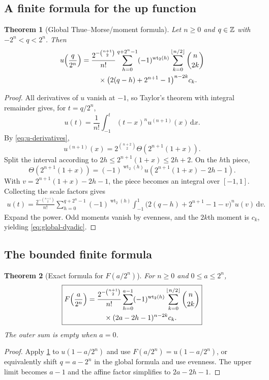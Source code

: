 \documentclass[11pt]{article}
\newtheorem{theorem}{Theorem}[section]
\theoremstyle{definition}
\theoremstyle{remark}
\newcommand{\wt}{\operatorname{wt}_2}\newcommand{\upfun}{\operatorname{up}}
\newcommand{\dd}{\,\mathrm d}\newcommand{\e}{\mathrm e}\newcommand{\ii}{\mathrm i}
\begin{document}
\subsection{A finite formula for the up function}
\begin{theorem}[Global Thue--Morse/moment formula]\label{thm:global-dyadic}
Let $n\ge0$ and $q\in\mathbb Z$ with $-2^n<q<2^n$.  Then
\begin{equation}\label{eq:global-dyadic}
\begin{aligned}
 u\!\left(\frac q{2^n}\right)
 ={}&\frac{2^{-\binom{n+1}{2}}}{n!}
 \sum_{h=0}^{q+2^n-1}(-1)^{\wt(h)}
 \sum_{k=0}^{\floor{n/2}}\binom n{2k}\\
 &\quad\times\bigl(2(q-h)+2^{n+1}-1\bigr)^{n-2k}c_k.
\end{aligned}
\end{equation}
\end{theorem}
\begin{proof}
All derivatives of $u$ vanish at $-1$, so Taylor's theorem with integral remainder gives, for $t=q/2^n$,
\begin{equation}\label{eq:taylor-integral-up}
 u(t)=\frac1{n!}\int_{-1}^{t}(t-x)^nu^{(n+1)}(x)\dd x.
\end{equation}
By \eqref{eq:u-derivatives},
\[
 u^{(n+1)}(x)=2^{\binom{n+2}{2}}
 \Theta(2^{n+1}(1+x)).
\]
Split the interval according to
$2h\le2^{n+1}(1+x)\le2h+2$.  On the $h$th piece,
\[
 \Theta(2^{n+1}(1+x))=(-1)^{\wt(h)}
 u(2^{n+1}(1+x)-2h-1).
\]
With $v=2^{n+1}(1+x)-2h-1$, the piece becomes an integral over $[-1,1]$.  Collecting the scale factors gives
\begin{align*}
 u(t)=\frac{2^{-\binom{n+1}{2}}}{n!}
 \sum_{h=0}^{q+2^n-1}(-1)^{\wt(h)}
 \int_{-1}^{1}
 \bigl(2(q-h)+2^{n+1}-1-v\bigr)^nu(v)\dd v.
\end{align*}
Expand the power.  Odd moments vanish by evenness, and the $2k$th moment is $c_k$, yielding \eqref{eq:global-dyadic}.
\end{proof}

\subsection{The bounded finite formula}
\begin{theorem}[Exact formula for $F(a/2^n)$]\label{thm:bounded-dyadic}
For $n\ge0$ and $0\le a\le2^n$,
\begin{equation}\label{eq:bounded-dyadic}
\boxed{\begin{aligned}
 F\!\left(\frac a{2^n}\right)
 ={}&\frac{2^{-\binom{n+1}{2}}}{n!}
 \sum_{h=0}^{a-1}(-1)^{\wt(h)}
 \sum_{k=0}^{\floor{n/2}}\binom n{2k}\\
 &\quad\times(2a-2h-1)^{n-2k}c_k.
\end{aligned}}
\end{equation}
The outer sum is empty when $a=0$.
\end{theorem}
\begin{proof}
Apply \cref{thm:global-dyadic} to $u(1-a/2^n)$ and use $F(a/2^n)=u(1-a/2^n)$, or equivalently shift $q=a-2^n$ in the global formula and use evenness.  The upper limit becomes $a-1$ and the affine factor simplifies to $2a-2h-1$.
\end{proof}
\end{document}
